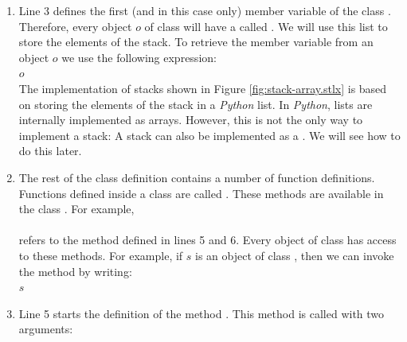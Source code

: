 \begin{enumerate}
      In order to create an object of class  we invoke the constructor as follows:
      \\[0.2cm]
      \hspace*{1.3cm}
      \\[0.2cm]
      This statement creates an uninitialized object (in other words: an empty object) of class 
      and then invokes the constructor  to initialize the member variable
       as an empty list.  Next, the object created is assigned to the variable .
\item Line 3 defines the first (and in this case only) member variable of the class .
      Therefore, every object $o$ of class  will have a  
      called
      . 
      We will use this list to store the elements of the stack.  To retrieve the member variable
       from an object $o$ we use the following expression:
      \\[0.2cm]
      \hspace*{1.3cm}
      $o$
      \\[0.2cm]
      The implementation of stacks shown
      in Figure \ref{fig:stack-array.stlx} is based on storing the elements of the stack in a
      \textsl{Python} list.  In \textsl{Python}, lists are internally implemented as arrays.  However,
      this is not the only way to implement a stack: A stack can also be implemented as a .
      We will see how to do this later.
\item The rest of the class definition contains a number of function definitions.  Functions defined inside
      a class are called .  These methods are available in the class
      .  For example, 
      \\[0.2cm]
      \hspace*{1.3cm}
      \\[0.2cm]
      refers to the method  defined in lines 5 and 6. Every object of class
       has access to these 
      methods.  For example, if $s$ is an object of class , then we can invoke the
      method  by writing:
      \\[0.2cm]
      \hspace*{1.3cm}
      $s$
\item Line 5 starts the definition of the method .  This method is called with two arguments:

\end{enumerate}
